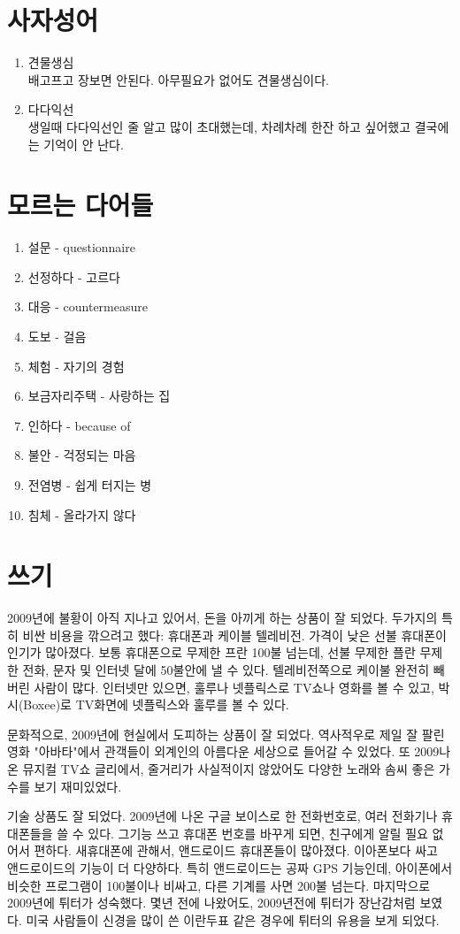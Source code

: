\documentclass{article}
\begin{document}
\section{사자성어}
\begin{enumerate}
  \item 견물생심 \\
배고프고 장보면 안된다. 아무필요가 없어도 견물생심이다.

  \item 다다익선 \\
생일때 다다익선인 줄 알고 많이 초대했는데, 차례차례 한잔 하고 싶어했고 결국에는 기억이 안 난다.
\end{enumerate}

\section{모르는 다어들}
\begin{enumerate}
  \item 설문 - questionnaire
  \item 선정하다 - 고르다
  \item 대응 - countermeasure
  \item 도보 - 걸음
  \item 체험 - 자기의 경험
  \item 보금자리주택 - 사랑하는 집
  \item 인하다 - because of
  \item 불안 - 걱정되는 마음
  \item 전염병 - 쉽게 터지는 병
  \item 침체 - 올라가지 않다
\end{enumerate}

\section{쓰기}
2009년에 불황이 아직 지나고 있어서, 돈을 아끼게 하는 상품이 잘 되었다. 두가지의 특히 비싼 비용을 깎으려고 했다: 휴대폰과 케이블 텔레비전.  가격이 낮은 선불 휴대폰이 인기가 많아졌다. 보통 휴대폰으로 무제한 프란 100불 넘는데, 선불 무제한 플란 무제한 전화, 문자 및 인터넷 달에 50불안에 낼 수 있다.  텔레비전쪽으로 케이불 완전히 빼버린 사람이 많다.  인터넷만 있으면, 훌루나 넷플릭스로 TV쇼나 영화를 볼 수 있고, 박시(Boxee)로 TV화면에 넷플릭스와 훌루를 볼 수 있다.

문화적으로, 2009년에 현실에서 도피하는 상품이 잘 되었다. 역사적우로 제일 잘 팔린 영화 "아바타"에서 관객들이 외계인의 아름다운 세상으로 들어갈 수 있었다.  또 2009나온 뮤지컬 TV쇼 글리에서, 줄거리가 사실적이지 않았어도 다양한 노래와 솜씨 좋은 가수를 보기 재미있었다. 

기술 상품도 잘 되었다. 2009년에 나온 구글 보이스로 한 전화번호로, 여러 전화기나 휴대폰들을 쓸 수 있다. 그기능 쓰고 휴대폰 번호를  바꾸게 되면, 친구에게 알릴 필요 없어서 편하다.  새휴대폰에 관해서, 앤드로이드 휴대폰들이 많아졌다.  이아폰보다 싸고 앤드로이드의 기능이 더 다양하다. 특히 앤드로이드는 공짜 GPS 기능인데, 아이폰에서 비슷한 프로그램이 100불이나 비싸고, 다른 기계를 사면 200불 넘는다.  마지막으로 2009년에 튀터가 성숙했다. 몇년 전에 나왔어도, 2009년전에 튀터가 장난감처럼 보였다. 미국 사람들이 신경을 많이 쓴 이란두표 같은 경우에 튀터의 유용을 보게 되었다.
\end{document}
